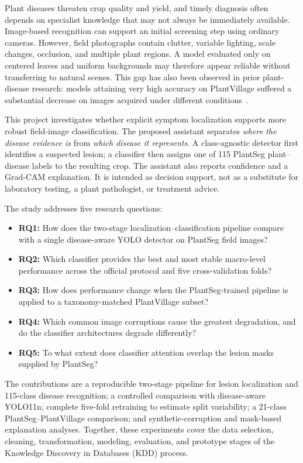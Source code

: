 \documentclass[conference]{IEEEtran}
\begin{document}
Plant diseases threaten crop quality and yield, and timely diagnosis often depends on specialist
knowledge that may not always be immediately available. Image-based recognition can support an
initial screening step using ordinary cameras. However, field photographs contain clutter,
variable lighting, scale changes, occlusion, and multiple plant regions. A model evaluated only on
centered leaves and uniform backgrounds may therefore appear reliable without transferring to
natural scenes. This gap has also been observed in prior plant-disease research: models attaining
very high accuracy on PlantVillage suffered a substantial decrease on images acquired under
different conditions~\cite{mohanty2016plantvillage}.

This project investigates whether explicit symptom localization supports more robust field-image
classification. The proposed assistant separates \emph{where the disease evidence is} from
\emph{which disease it represents}. A class-agnostic detector first identifies a suspected lesion;
a classifier then assigns one of 115 PlantSeg plant--disease labels to the resulting crop. The
assistant also reports confidence and a Grad-CAM explanation. It is intended as decision support,
not as a substitute for laboratory testing, a plant pathologist, or treatment advice.

The study addresses five research questions:

\begin{itemize}
    \item \textbf{RQ1:} How does the two-stage localization--classification pipeline compare with
    a single disease-aware YOLO detector on PlantSeg field images?
    \item \textbf{RQ2:} Which classifier provides the best and most stable macro-level performance
    across the official protocol and five cross-validation folds?
    \item \textbf{RQ3:} How does performance change when the PlantSeg-trained pipeline is applied
    to a taxonomy-matched PlantVillage subset?
    \item \textbf{RQ4:} Which common image corruptions cause the greatest degradation, and do the
    classifier architectures degrade differently?
    \item \textbf{RQ5:} To what extent does classifier attention overlap the lesion masks supplied
    by PlantSeg?
\end{itemize}

The contributions are a reproducible two-stage pipeline for lesion localization and 115-class
disease recognition; a controlled comparison with disease-aware YOLO11n; complete five-fold
retraining to estimate split variability; a 21-class PlantSeg--PlantVillage comparison; and
synthetic-corruption and mask-based explanation analyses. Together, these experiments cover the
data selection, cleaning, transformation, modeling, evaluation, and prototype stages of the
Knowledge Discovery in Databases (KDD) process.
\end{document}
